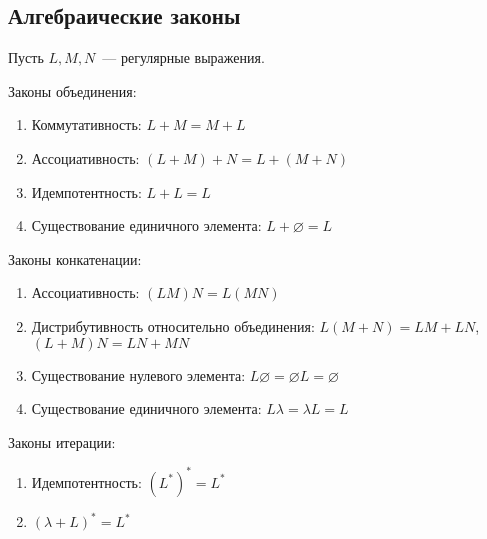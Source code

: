\subsection{Алгебраические законы}
Пусть $L, M, N$~--- регулярные выражения.

Законы объединения:
\begin{enumerate}
	\item Коммутативность: $L + M = M + L$
	\item Ассоциативность: $(L + M) + N = L + (M + N)$
	\item Идемпотентность: $L + L = L$
	\item Существование единичного элемента: $L + \varnothing = L$
\end{enumerate}

Законы конкатенации:
\begin{enumerate}
	\item Ассоциативность: $(LM)N = L(MN)$
	\item Дистрибутивность относительно объединения: $L(M + N) = LM + LN$, $(L + M)N = LN + MN$
	\item Существование нулевого элемента: $L \varnothing = \varnothing L = \varnothing$
	\item Существование единичного элемента: $L \lambda = \lambda L = L$
\end{enumerate}

Законы итерации:
\begin{enumerate}
	\item Идемпотентность: $(L^*)^* = L^*$
	\item $(\lambda + L)^* = L^*$
\end{enumerate}